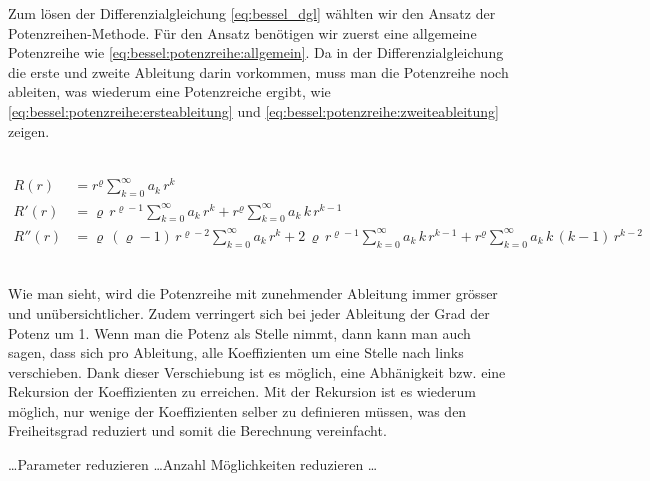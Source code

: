 \begin{refsection}
\begin{normalsize}
	Zum l\"osen der Differenzialgleichung \ref{eq:bessel_dgl} w\"ahlten wir den Ansatz der Potenzreihen-Methode.
	F\"ur den Ansatz ben\"otigen wir zuerst eine allgemeine Potenzreihe wie \ref{eq:bessel:potenzreihe:allgemein}.
	Da in der Differenzialgleichung die erste und zweite Ableitung darin vorkommen,
	muss man die Potenzreihe noch ableiten, was wiederum eine Potenzreiche ergibt,
	wie \ref{eq:bessel:potenzreihe:ersteableitung} und \ref{eq:bessel:potenzreihe:zweiteableitung} zeigen.
\end{normalsize}
\\
\begin{align}
	R \left( r \right)
	&=
	r^{\varrho}
	\sum_{k=0}^{\infty} a_k \, r^k
	\label{eq:bessel:potenzreihe:allgemein}
\\
	R'\left( r \right)
	&=
	\varrho \, r^{\varrho - 1}
	\sum_{k=0}^{\infty} a_k \, r^k
	+
	r^{\varrho}
	\sum_{k=0}^{\infty} a_k \, k \, r^{k - 1}
	\label{eq:bessel:potenzreihe:ersteableitung}
\\
	R'' \left( r \right)
	&=
	\varrho \, \left( \varrho - 1 \right) \, r^{\varrho - 2}
	\sum_{k=0}^{\infty} a_k \, r^k
	+
	2 \, \varrho \, r^{\varrho - 1}
	\sum_{k=0}^{\infty} a_k \, k \, r^{k - 1}
	+
	r^{\varrho}
	\sum_{k=0}^{\infty} a_k \, k \, \left( k - 1 \right) \, r^{k - 2}	
	\label{eq:bessel:potenzreihe:zweiteableitung}
\end{align}
\\
\begin{normalsize}
	Wie man sieht,
	wird die Potenzreihe mit zunehmender Ableitung immer gr\"osser und un\"ubersichtlicher.
	Zudem verringert sich bei jeder Ableitung der Grad der Potenz um 1.
	Wenn man die Potenz als Stelle nimmt,
	dann kann man auch sagen,
	dass sich pro Ableitung,
	alle Koeffizienten um eine Stelle nach links verschieben.
	Dank dieser Verschiebung ist es m\"oglich,
	eine Abh\"anigkeit bzw. eine Rekursion der Koeffizienten zu erreichen.
	Mit der Rekursion ist es wiederum m\"oglich,
	nur wenige der Koeffizienten selber zu definieren m\"ussen,
	was den Freiheitsgrad reduziert und somit die Berechnung vereinfacht.
	
	\begin{description}[style=nextline]
		\item[Wieso ist es ein Vorteil, den Freiheitsgrad zu reduzieren?]
		\dots Parameter reduzieren \dots Anzahl M\"oglichkeiten reduzieren \dots
	\end{description}
	
\end{normalsize}


\end{refsection}
